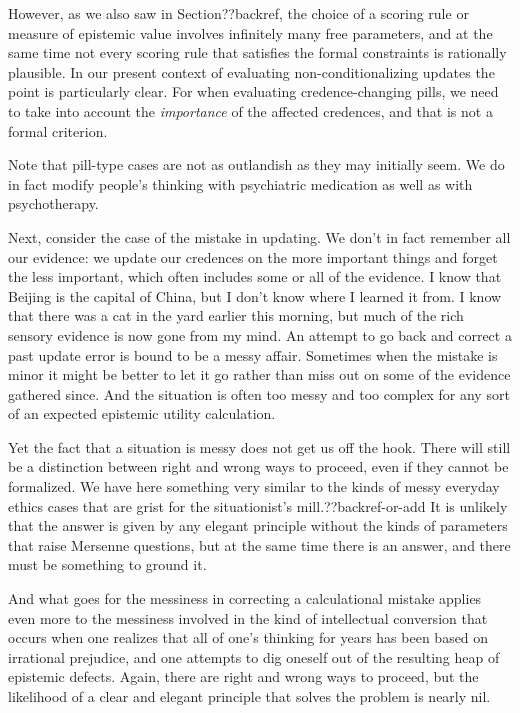 However, as we also saw in Section??backref, the choice of a scoring rule or measure of epistemic value involves infinitely
many free parameters, and at the same time not every scoring rule that satisfies the formal constraints is rationally
plausible. In our present context of evaluating non-conditionalizing updates the point is particularly clear. For when
evaluating credence-changing pills, we need to take into account the \textit{importance} of the affected credences, and
that is not a formal criterion. 

Note that pill-type cases are not as outlandish as they may initially seem. We do in fact modify people's thinking with
psychiatric medication as well as with psychotherapy.

Next, consider the case of the mistake in updating. We don't in fact remember all our evidence:
we update our credences on the more important things and forget the less important, which often includes some or
all of the evidence. I know that Beijing is the capital of China, but I don't know where I learned it from. I know that 
there was a cat in the yard earlier this morning, but much of the rich sensory evidence is now gone from my mind. 
An attempt to go back and correct a past update error is bound to be a messy affair. Sometimes when the mistake is minor
it might be better to let it go rather than miss out on some of the evidence gathered since. And the situation is often
too messy and too complex for any sort of an expected epistemic utility calculation. 

Yet the fact that a situation is messy does not get us off the hook. There will still
be a distinction between right and wrong ways to proceed, even if they cannot be formalized. We have here something very
similar to the kinds of messy everyday ethics cases that are grist for the situationist's mill.??backref-or-add 
It is unlikely that the answer is given by any elegant principle without the kinds of parameters that raise Mersenne
questions, but at the same time there is an answer, and there
must be something to ground it.

And what goes for the messiness in correcting a calculational mistake applies even more to the messiness involved in
the kind of intellectual conversion that occurs when one realizes that all of one's thinking for years has been based
on irrational prejudice, and one attempts to dig oneself out of the resulting heap of epistemic defects. Again, there
are right and wrong ways to proceed, but the likelihood of a clear and elegant principle that solves the problem is
nearly nil. 

